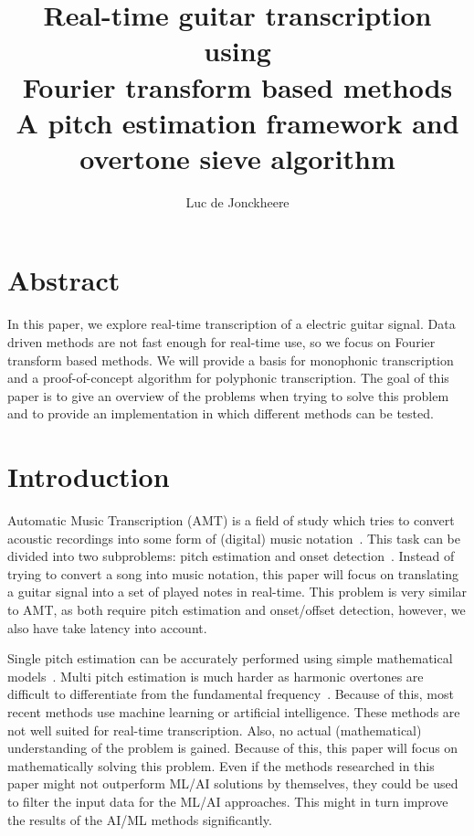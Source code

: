 \documentclass[10pt,twocolumn]{article}
\title{\textbf{Real-time guitar transcription using\\Fourier transform based methods}\\A pitch estimation framework and overtone sieve algorithm}
\author{Luc de Jonckheere}
\begin{document}

\maketitle


\section*{Abstract}
In this paper, we explore real-time transcription of a electric guitar signal. Data driven methods are not fast enough for real-time use, so we focus on Fourier transform based methods. We will provide a basis for monophonic transcription and a proof-of-concept algorithm for polyphonic transcription. The goal of this paper is to give an overview of the problems when trying to solve this problem and to provide an implementation in which different methods can be tested.



\section{Introduction}
Automatic Music Transcription (AMT) is a field of study which tries to convert acoustic recordings into some form of (digital) music notation~\cite{survey1}. This task can be divided into two subproblems: pitch estimation and onset detection~\cite{survey2}. Instead of trying to convert a song into music notation, this paper will focus on translating a guitar signal into a set of played notes in real-time. This problem is very similar to AMT, as both require pitch estimation and onset/offset detection, however, we also have take latency into account.

Single pitch estimation can be accurately performed using simple mathematical models~\cite{mono}. Multi pitch estimation is much harder as harmonic overtones are difficult to differentiate from the fundamental frequency~\cite{oud}. Because of this, most recent methods use machine learning or artificial intelligence. These methods are not well suited for real-time transcription. Also, no actual (mathematical) understanding of the problem is gained. Because of this, this paper will focus on mathematically solving this problem. Even if the methods researched in this paper might not outperform ML/AI solutions by themselves, they could be used to filter the input data for the ML/AI approaches. This might in turn improve the results of the AI/ML methods significantly.
\end{document}
